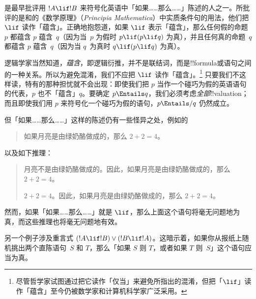 \documentclass[../../../include/open-logic-section]{subfiles}
\begin{document}


是最早批评用 $!A \lif !B$ 来符号化英语中「如果……那么……」陈述的人之一。所批评的是和的《数学原理》（\textit{Principia Mathematica}）中实质条件句的用法，他们把 $\lif$ 读作「蕴含」。正确地抱怨道，如果 $\lif$ 表示「蕴含」，那么任何假的命题~$p$ 都蕴含 $p$ 蕴含~$q$（因为当~$p$ 为假时 $p \lif (p \lif q)$ 为真），并且任何真的命题~$q$ 都蕴含 $p$ 蕴含~$q$（因为当 $q$~为真时 $q \lif (p \lif q)$ 为真）。

逻辑学家当然知道，\emph{蕴含}，即逻辑衍推，并不是联结词，而是!!{formula}或语句之间的一种关系。所以为避免混淆，我们不应把 $\lif$ 读作「蕴含」。\footnote{尽管哲学家试图通过把它读作「仅当」来避免所指出的混淆，但把「$\lif$」读作「蕴含」至今仍被数学家和计算机科学家广泛采用。} 只要我们不这样读，特有的那种担忧就不会出现：即使我们把 $p$ 当作一个碰巧为假的英语语句的代表，$p$ 也不「蕴含」$q$。要确定 $p \Entails q$，我们必须考虑\emph{全部}!!{valuation}；而且即使我们用 $p$ 来符号化一个碰巧为假的语句，$p \Entails/ q$ 仍然成立。

但「如果……那么……」这样的陈述仍有一些怪异之处，例如的
\begin{quote}
如果月亮是由绿奶酪做成的，那么 $2+2=4$。
\end{quote}
以及如下推理：
\begin{quote}
  月亮不是由绿奶酪做成的。因此，如果月亮是由绿奶酪做成的，那么 $2+2=4$。

  $2+2 = 4$。因此，如果月亮是由绿奶酪做成的，那么 $2+2=4$。
\end{quote}
然而，如果「如果……那么……」就是 $\lif$，那么上面这个语句将毫无问题地为真，而这些推理也将毫无问题地有效。

另一个例子涉及重言式 $(!A \lif !B) \lor (!B \lif
!A)$。这暗示着，如果你从报纸上随机挑出两个直陈语句~$S$ 和 $T$，那么「如果 $S$ 则 $T$，或者如果 $T$ 则~$S$」这个语句应当为真。
\end{document}
